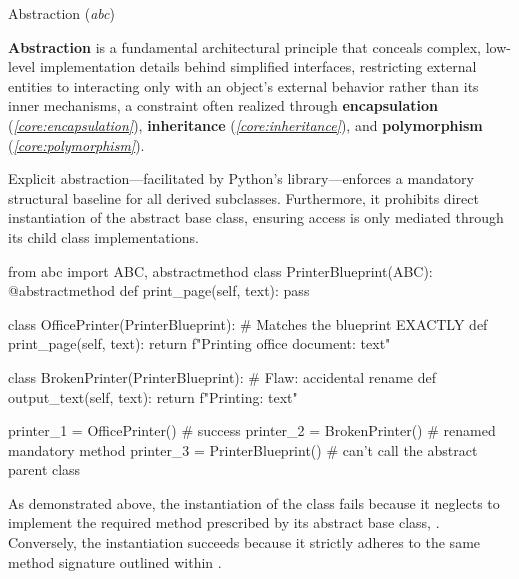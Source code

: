 \documentclass[10pt]{article}
\begin{document}
    \begin{core}[label=core:abstraction]{Abstraction (\textit{abc})}

      \textbf{Abstraction} is a fundamental architectural principle that conceals complex, low-level implementation details behind simplified interfaces, restricting external entities to interacting only with an object's external behavior rather than its inner mechanisms, a constraint often realized through \textbf{encapsulation} (\textit{\autoref{core:encapsulation}}), \textbf{inheritance} (\textit{\autoref{core:inheritance}}), and \textbf{polymorphism} (\textit{\autoref{core:polymorphism}}).

      Explicit abstraction---facilitated by Python's  library---enforces a mandatory structural baseline for all derived subclasses. Furthermore, it prohibits direct instantiation of the abstract base class, ensuring access is only mediated through its child class implementations.

      \begin{pyconsole}

        from abc import ABC, abstractmethod
        class PrinterBlueprint(ABC):
            @abstractmethod
            def print_page(self, text):
                pass

        class OfficePrinter(PrinterBlueprint): # Matches the blueprint EXACTLY
            def print_page(self, text):
                return f"Printing office document: {text}"

        class BrokenPrinter(PrinterBlueprint): # Flaw: accidental rename
            def output_text(self, text):
                return f"Printing: {text}"

        printer_1 = OfficePrinter() # success
        printer_2 = BrokenPrinter() # renamed mandatory method
        printer_3 = PrinterBlueprint() # can't call the abstract parent class

      \end{pyconsole}

      As demonstrated above, the instantiation of the  class fails because it neglects to implement the required  method prescribed by its abstract base class, . Conversely, the  instantiation succeeds because it strictly adheres to the same method signature outlined within .

    \end{core}
\end{document}
